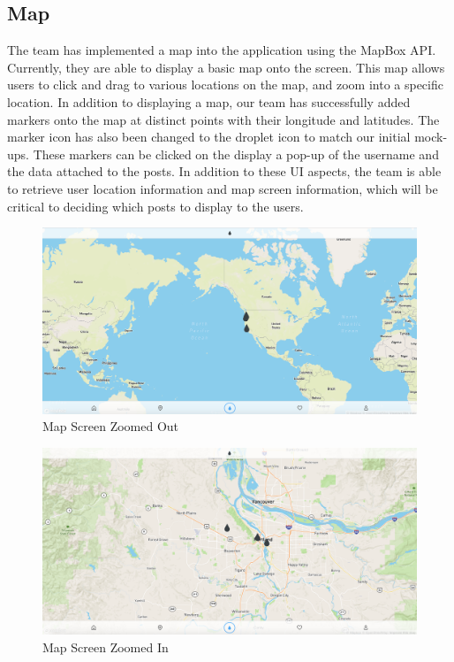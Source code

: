 \documentclass[draftclsnofoot, onecolumn, letterpaper,10pt,compsoc]{IEEEtran}
\begin{document}
\subsection{Map}
The team has implemented a map into the application using the MapBox API. Currently, they are able to display a basic map onto the screen. This map allows users to click and drag to various locations on the map, and zoom into a specific location. In addition to displaying a map, our team has successfully added markers onto the map at distinct points with their longitude and latitudes. The marker icon has also been changed to the droplet icon to match our initial mock-ups. These markers can be clicked on the display a pop-up of the username and the data attached to the posts. In addition to these UI aspects, the team is able to retrieve user location information and map screen information, which will be critical to deciding which posts to display to the users.

\begin{figure}[!ht]
    \centering
    \includegraphics[scale=.25]{images/Map1.png}
    \caption{Map Screen Zoomed Out}
    \label{fig:my_label}
\end{figure}
\begin{figure}[!ht]
    \centering
    \includegraphics[scale=.25]{images/Map2.png}
    \caption{Map Screen Zoomed In}
    \label{fig:my_label}
\end{figure}
\end{document}
